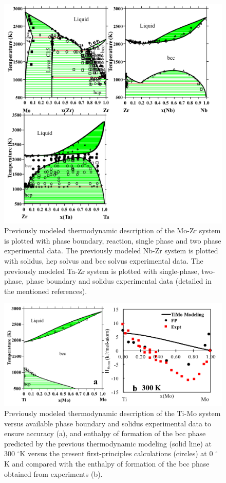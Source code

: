 \newpage
\begin{figure}[H]
	\centering
	\includegraphics[width=\textwidth]{Chapter-3/Figures/binary2.png}
	\caption{Previously modeled thermodynamic description of the Mo-Zr \cite{Perez2003} system is plotted with phase boundary, reaction, single phase and two phase experimental data. The previously modeled Nb-Zr \cite{Guillermet1991,Abriata1982} system is plotted with solidus, hcp solvus and bcc solvus experimental data. The previously modeled Ta-Zr \cite{Guillermet1995} system is plotted with single-phase, two-phase, phase boundary and solidus experimental data (detailed in the mentioned references).}
	\label{Ch3-figure:binary2}
\end{figure}

\newpage
\begin{figure}[H]
	\centering
	\includegraphics[width=\textwidth]{Chapter-3/Figures/TiMo.png}
	\caption{Previously modeled thermodynamic description of the Ti-Mo system versus available phase boundary and solidus experimental data to ensure accuracy \cite{Ansara1998,Murray1981} (a), and enthalpy of formation of the bcc phase predicted by the previous thermodynamic modeling (solid line) at 300 $^{\circ}$K versus the present first-principles calculations (circles) at 0 $^{\circ}$K and compared with the enthalpy of formation of the bcc phase obtained from experiments \cite{Uesugi2013} (b).}
	\label{Ch3-figure:TiMo}
\end{figure}

